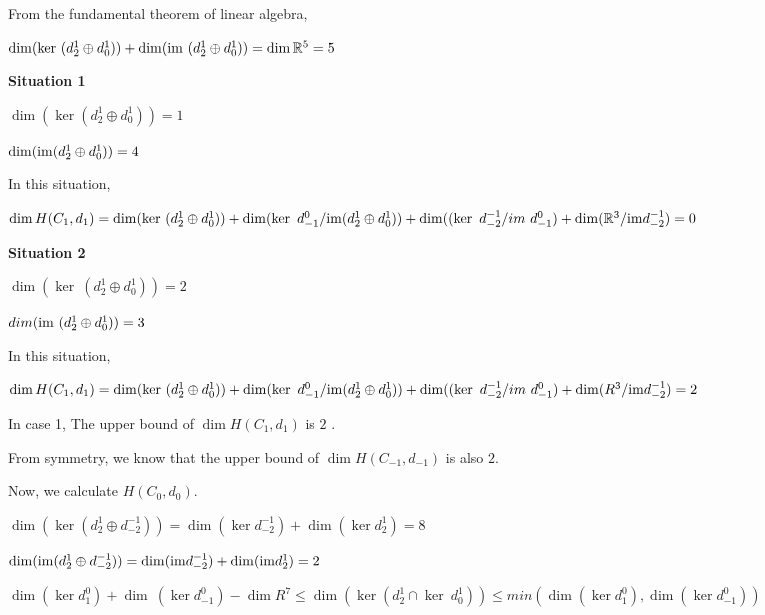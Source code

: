 \documentclass{amsart}
\theoremstyle{definition}
\newcommand{\im}{{\rm im}}
\begin{document}
\bigskip
From the fundamental theorem of linear algebra,

\begin{center}
    $\dim(\ker~(d^1_2 \oplus d^1_0))+\dim(\im~(d^1_2 \oplus d^1_0))= \dim \mathbb{R}^5=5$
\end{center}





\bigskip

\textbf{Situation 1}

\begin{center}
$\dim(\ker(d^1_2 \oplus d^1_0))=1$
            
$\dim(\im(d^1_2 \oplus d^1_0))=4$
\end{center}

            
\bigskip
In this situation,

\begin{center}
    $\dim H(C_1,d_1) = 
\dim(\ker~(d^1_2 \oplus d^1_0))
+
\dim(\ker~d^0_{-1}/\im(d^1_2 \oplus d^1_0))
+
\dim((\ker~d^{-1}_{-2}/im~d^0_{-1})
+
\dim(\mathbb{R}^3/\im d^{-1}_{-2})=0$
\end{center}


\bigskip
\textbf{Situation 2}

$\dim(\ker~(d^1_2 \oplus d^1_0))=2$
            
$dim(\im~(d^1_2 \oplus d^1_0))=3$
            
\bigskip
In this situation,

\bigskip
$\dim H(C_1,d_1) 
= 
\dim(\ker~(d^1_2 \oplus d^1_0))
+
\dim(\ker~d^0_{-1}/\im(d^1_2 \oplus d^1_0))
+
\dim((\ker~d^{-1}_{-2}/im~d^0_{-1})
+
\dim(R^3/\im d^{-1}_{-2})
=
2$

\bigskip
In case 1,
The upper bound of $\dim H(C_1,d_1)$ is $2$ .

From symmetry, we know that the upper bound of $\dim H(C_{-1},d_{-1})$ is also $2$.






\bigskip
Now, we calculate $H(C_0,d_0)$.

$\dim(\ker (d^1_2\oplus d^{-1}_{-2})) = \dim (\ker d^{-1}_{-2}) + \dim (\ker d^{1}_{2}) = 8$

$\dim(\im (d^1_2\oplus d^{-1}_{-2})) = \dim (\im d^{-1}_{-2}) + \dim (\im d^{1}_{2}) = 2$

\bigskip
$\dim (\ker d^0_{1})
+ 
\dim~(\ker d^0_{-1} )
- 
\dim R^7
\leq
\dim (\ker (d^{1}_{2} \cap \ker~d^1_0))
\leq
min (\dim (\ker d^0_{1}),\dim (\ker d^0_{-1}))$
\end{document}

